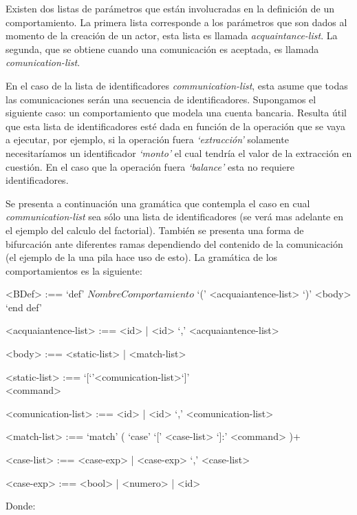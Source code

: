 Existen dos listas de parámetros que están involucradas en la definición de un comportamiento. La primera lista corresponde a los parámetros que son dados al momento de la creación de un actor, esta lista es llamada \textit{acquaintance-list}. La segunda, que se obtiene cuando una comunicación es aceptada, es llamada \textit{comunication-list}.

En el caso de la lista de identificadores \textit{communication-list}, esta asume que todas las comunicaciones serán una secuencia de identificadores. Supongamos el siguiente caso: un comportamiento que modela una cuenta bancaria. Resulta útil que esta lista de identificadores esté dada en función de la operación que se vaya a ejecutar, por ejemplo, si la operación fuera \textit{`extracción'} solamente necesitaríamos un identificador \textit{`monto'} el cual tendría el valor de la extracción en cuestión. En el caso que la operación fuera \textit{`balance'} esta no requiere identificadores. 

Se presenta a continuación una gramática que contempla el caso en cual \textit{communication-list} sea sólo una lista de identificadores (se verá mas adelante en el ejemplo del calculo del factorial). También se presenta una forma de bifurcación ante diferentes ramas dependiendo del contenido de la comunicación (el ejemplo de la una pila hace uso de esto). La gramática de los comportamientos es la siguiente:

\begin{grammar}
<BDef> :== `def' $NombreComportamiento$ `(' <acquaiantence-list> `)' <body> `end def'

<acquaiantence-list> :== <id> | <id> `,' <acquaiantence-list> 

<body> :== <static-list> | <match-list>

<static-list> :== `[`'<comunication-list>`]' \\ <command>

<comunication-list> :== <id> | <id> `,' <comunication-list>

<match-list> :==  `match' ( `case' `[' <case-list> `]:' <command> )+  

<case-list> :== <case-exp> | <case-exp> `,' <case-list> 

<case-exp> :== <bool> | <numero> | <id>  
\end{grammar}
Donde: 


